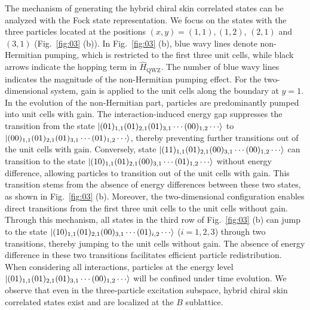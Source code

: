 \documentclass[longbibliography, aps, prx, amsmath, amssymb, amsfonts, twocolumn,superscriptaddress, footinbib]{revtex4-1}
\begin{document}
	
	The mechanism of generating the hybrid chiral skin correlated states can be analyzed with the Fock state representation. 
	We focus on the states with the three particles located at the positions $(x,y)=(1,1), (1,2)$, $(2,1)$ and $(3,1)$ (Fig.~\ref{fig:03} (b)).
	In Fig.~\ref{fig:03} (b), blue wavy lines denote non-Hermitian pumping, which is restricted to the first three unit cells, while black arrows indicate the hopping term in $\hat{H}_{\text{QWZ}}$. The number of blue wavy lines indicates the magnitude of the non-Hermitian pumping effect.
	For the two-dimensional system, gain is applied to the unit cells along the boundary at $y=1$.
	In the evolution of the non-Hermitian part, particles are predominantly pumped into unit cells with gain. The interaction-induced energy gap suppresses the transition from the state 
	$\ket{(01)_{1,1}(01)_{2,1}(01)_{3,1}\cdots(00)_{1,2}\cdots}$ to $\ket{(00)_{1,1}(01)_{2,1}(01)_{3,1}\cdots(01)_{1,2}\cdots}$,
	 thereby preventing further transitions out of the unit cells with gain. 
	Conversely, state $\ket{(11)_{1,1}(01)_{2,1}(00)_{3,1}\cdots(00)_{1,2}\cdots}$ can transition to the state $\ket{(10)_{1,1}(01)_{2,1}(00)_{3,1}\cdots(01)_{1,2}\cdots}$ 
	without energy difference, allowing particles to transition out of the unit cells with gain. This transition stems from the absence of energy differences between these two states, as shown in Fig.~\ref{fig:03} (b). 
	Moreover, the two-dimensional configuration enables direct transitions from the first three unit cells to the unit cells without gain.
	Through this mechanism, all states in the third row of Fig.~\ref{fig:03} (b) can jump to the state 
	$\ket{(10)_{1,1}(01)_{2,1}(00)_{3,1}\cdots(01)_{i,2}\cdots}$ ($i=1,2,3$) 
	through two transitions, thereby jumping to the unit cells without gain. 
	The absence of energy difference in these two transitions facilitates efficient particle redistribution.
	When considering all interactions, particles at the energy level $\ket{(01)_{1,1}(01)_{2,1}(01)_{3,1}\cdots(00)_{1,2}\cdots}$ will be confined under time evolution.
	We observe that even in the three-particle excitation subspace, hybrid chiral skin correlated states exist and are localized at the $B$ sublattice. 
\end{document}
